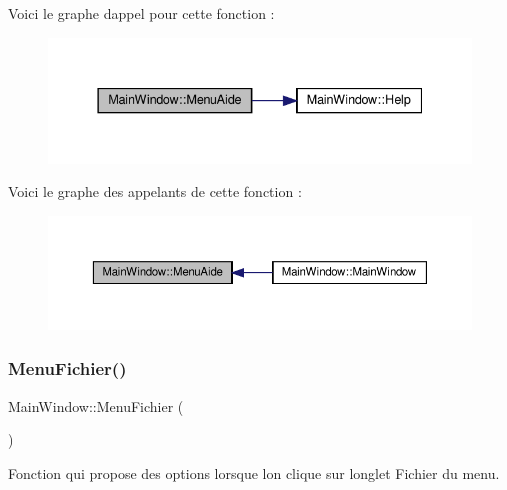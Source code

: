 Voici le graphe d\textquotesingle{}appel pour cette fonction \+:
\nopagebreak
\begin{figure}[H]
\begin{center}
\leavevmode
\includegraphics[width=337pt]{class_main_window_aca604490b4fa5077638a5245bee9e706_cgraph}
\end{center}
\end{figure}
Voici le graphe des appelants de cette fonction \+:
\nopagebreak
\begin{figure}[H]
\begin{center}
\leavevmode
\includegraphics[width=350pt]{class_main_window_aca604490b4fa5077638a5245bee9e706_icgraph}
\end{center}
\end{figure}
\mbox{\label{class_main_window_ace494e8ee2d76a6dbd390dc48b9c986c}} 
\subsubsection{\texorpdfstring{Menu\+Fichier()}{MenuFichier()}}
{\footnotesize\ttfamily Main\+Window\+::\+Menu\+Fichier (\begin{DoxyParamCaption}{ }\end{DoxyParamCaption})\hspace{0.3cm}{\ttfamily [private]}}



Fonction qui propose des options lorsque l\textquotesingle{}on clique sur l\textquotesingle{}onglet Fichier du menu. 

